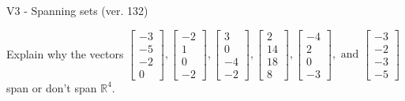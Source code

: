 \begin{exercise}
  \begin{exerciseTitle}V3 - Spanning sets (ver. 132)\end{exerciseTitle}
  \begin{exerciseStatement}
    Explain why the vectors \(\left[\begin{array}{r}
-3 \\
-5 \\
-2 \\
0
\end{array}\right] , \left[\begin{array}{r}
-2 \\
1 \\
0 \\
-2
\end{array}\right] , \left[\begin{array}{r}
3 \\
0 \\
-4 \\
-2
\end{array}\right] , \left[\begin{array}{r}
2 \\
14 \\
18 \\
8
\end{array}\right] , \left[\begin{array}{r}
-4 \\
2 \\
0 \\
-3
\end{array}\right] , \text{ and } \left[\begin{array}{r}
-3 \\
-2 \\
-3 \\
-5
\end{array}\right]\) span or don't span \(\mathbb{R}^4\). 
	



\end{exerciseStatement}
\end{exercise}
